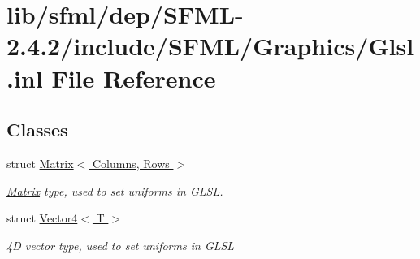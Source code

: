\hypertarget{_glsl_8inl}{\section{lib/sfml/dep/\-S\-F\-M\-L-\/2.4.2/include/\-S\-F\-M\-L/\-Graphics/\-Glsl.inl File Reference}
\label{_glsl_8inl}
}
\subsection*{Classes}
\begin{DoxyCompactItemize}
\item 
struct \hyperlink{struct_matrix}{Matrix$<$ Columns, Rows $>$}
\begin{DoxyCompactList}\small\item\em \hyperlink{struct_matrix}{Matrix} type, used to set uniforms in G\-L\-S\-L. \end{DoxyCompactList}\item 
struct \hyperlink{struct_vector4}{Vector4$<$ T $>$}
\begin{DoxyCompactList}\small\item\em 4\-D vector type, used to set uniforms in G\-L\-S\-L \end{DoxyCompactList}\end{DoxyCompactItemize}
